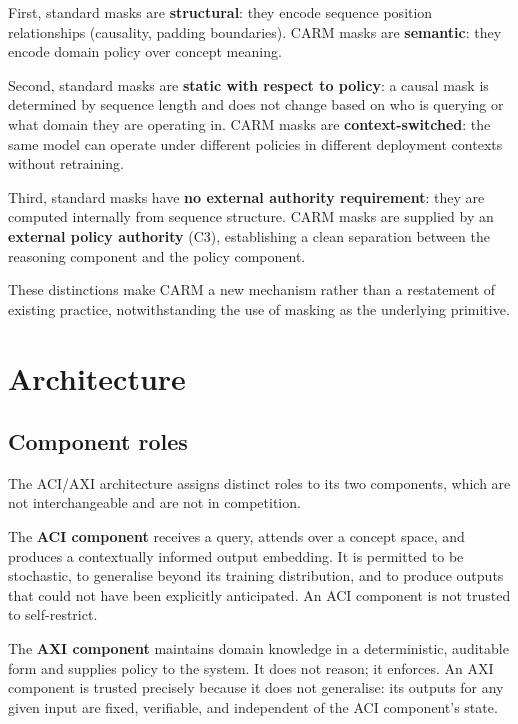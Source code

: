 \documentclass[11pt,a4paper]{article}
\theoremstyle{definition}
\begin{document}
First, standard masks are \textbf{structural}: they encode sequence position
relationships (causality, padding boundaries). CARM masks are \textbf{semantic}:
they encode domain policy over concept meaning.

Second, standard masks are \textbf{static with respect to policy}: a causal mask is
determined by sequence length and does not change based on who is querying or what
domain they are operating in. CARM masks are \textbf{context-switched}: the same
model can operate under different policies in different deployment contexts without
retraining.

Third, standard masks have \textbf{no external authority requirement}: they are
computed internally from sequence structure. CARM masks are supplied by an
\textbf{external policy authority} (C3), establishing a clean separation between the
reasoning component and the policy component.

These distinctions make CARM a new mechanism rather than a restatement of existing
practice, notwithstanding the use of masking as the underlying primitive.

\section{Architecture}
\label{sec:architecture}

\subsection{Component roles}

The ACI/AXI architecture assigns distinct roles to its two components, which are not
interchangeable and are not in competition.

The \textbf{ACI component} receives a query, attends over a concept space, and
produces a contextually informed output embedding. It is permitted to be stochastic,
to generalise beyond its training distribution, and to produce outputs that could not
have been explicitly anticipated. An ACI component is not trusted to self-restrict.

The \textbf{AXI component} maintains domain knowledge in a deterministic, auditable
form and supplies policy to the system. It does not reason; it enforces. An AXI
component is trusted precisely because it does not generalise: its outputs for any
given input are fixed, verifiable, and independent of the ACI component's state.
\end{document}
